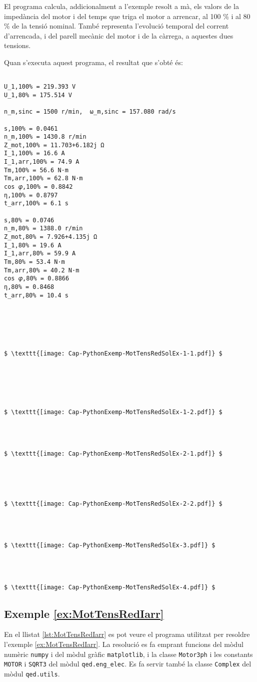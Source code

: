 El programa calcula, addicionalment a l'exemple resolt a mà, els valors de la impedància del motor i  del temps que triga el motor a arrencar, al 100 \% i al 80 \% de la tensió nominal. També  representa l'evolució temporal del  corrent d'arrencada, i del parell mecànic del motor i de la càrrega, a aquestes dues tensions.

Quan s'executa aquest programa, el resultat que s'obté és:
\lstset{
	language=,
	numbers=none,
	frame=none
}
\begin{lstlisting}[mathescape=true]
	
U_1,100% = 219.393 V
U_1,80% = 175.514 V

n_m,sinc = 1500 r/min,  ω_m,sinc = 157.080 rad/s

s,100% = 0.0461
n_m,100% = 1430.8 r/min
Z_mot,100% = 11.703+6.182j Ω
I_1,100% = 16.6 A
I_1,arr,100% = 74.9 A
Tm,100% = 56.6 N·m
Tm,arr,100% = 62.8 N·m
cos 𝜑,100% = 0.8842
η,100% = 0.8797
t_arr,100% = 6.1 s

s,80% = 0.0746
n_m,80% = 1388.0 r/min
Z_mot,80% = 7.926+4.135j Ω
I_1,80% = 19.6 A
I_1,arr,80% = 59.9 A
Tm,80% = 53.4 N·m
Tm,arr,80% = 40.2 N·m
cos 𝜑,80% = 0.8866
η,80% = 0.8468
t_arr,80% = 10.4 s






$ \texttt{[image: Cap-PythonExemp-MotTensRedSolEx-1-1.pdf]} $






$ \texttt{[image: Cap-PythonExemp-MotTensRedSolEx-1-2.pdf]} $




$ \texttt{[image: Cap-PythonExemp-MotTensRedSolEx-2-1.pdf]} $





$ \texttt{[image: Cap-PythonExemp-MotTensRedSolEx-2-2.pdf]} $




$ \texttt{[image: Cap-PythonExemp-MotTensRedSolEx-3.pdf]} $




$ \texttt{[image: Cap-PythonExemp-MotTensRedSolEx-4.pdf]} $
\end{lstlisting} 



\hypertarget{exemple:MotTensRedIarr}{\subsection{Exemple \ref*{ex:MotTensRedIarr} \MotTensRedIarr}}
En el llistat \vref{lst:MotTensRedIarr} es pot veure el programa utilitzat per resoldre l'exemple \vref{ex:MotTensRedIarr}. La resolució es fa emprant funcions del mòdul numèric \texttt{numpy} i del mòdul gràfic \texttt{matplotlib}, i la classe \texttt{Motor3ph} i les constants \texttt{MOTOR} i \texttt{SQRT3}  del mòdul \texttt{qed.eng\_elec}.  Es fa servir també la classe \texttt{Complex} del mòdul \texttt{qed.utils}.


